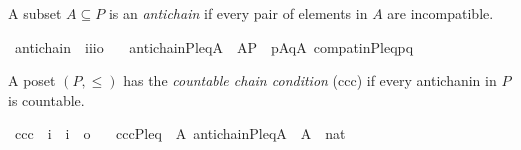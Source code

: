 A subset $A \subseteq P$ is an \emph{antichain} if every pair of
elements in $A$ are incompatible.
\begin{isabellebody}
\isanewline
{}\isamarkupfalse%
\ antichain\ {\isacharcolon}{\isacharcolon}\ {\isachardoublequoteopen}i{\isasymRightarrow}i{\isasymRightarrow}i{\isasymRightarrow}o{\isachardoublequoteclose}\ \isanewline
\ \ {\isachardoublequoteopen}antichain{\isacharparenleft}P{\isacharcomma}leq{\isacharcomma}A{\isacharparenright}\ {\isacharequal}{\isacharequal}\ A{\isasymsubseteq}P\ {\isasymand}\ {\isacharparenleft}{\isasymforall}p{\isasymin}A{\isachardot}{\isasymforall}q{\isasymin}A{\isachardot}{\isacharparenleft}{\isasymnot}\ compat{\isacharunderscore}in{\isacharparenleft}P{\isacharcomma}leq{\isacharcomma}p{\isacharcomma}q{\isacharparenright}{\isacharparenright}{\isacharparenright}{\isachardoublequoteclose}\isanewline
\end{isabellebody}

A poset $(P,\leqslant)$ has the \emph{countable chain condition} (ccc)
if every antichanin in $P$ is countable.
\begin{isabellebody}
  \isanewline
  \isamarkupfalse%
  \ ccc\ {\isacharcolon}{\isacharcolon}\ {\isachardoublequoteopen}i\ {\isasymRightarrow}\ i\ {\isasymRightarrow}\ o{\isachardoublequoteclose}\ \isanewline
\ \ {\isachardoublequoteopen}ccc{\isacharparenleft}P{\isacharcomma}leq{\isacharparenright}\ {\isacharequal}{\isacharequal}\ {\isasymforall}A{\isachardot}\ antichain{\isacharparenleft}P{\isacharcomma}leq{\isacharcomma}A{\isacharparenright}\ {\isasymlongrightarrow}\ {\isacharbar}A{\isacharbar}\ {\isasymle}\ nat{\isachardoublequoteclose}\isanewline
\end{isabellebody}

